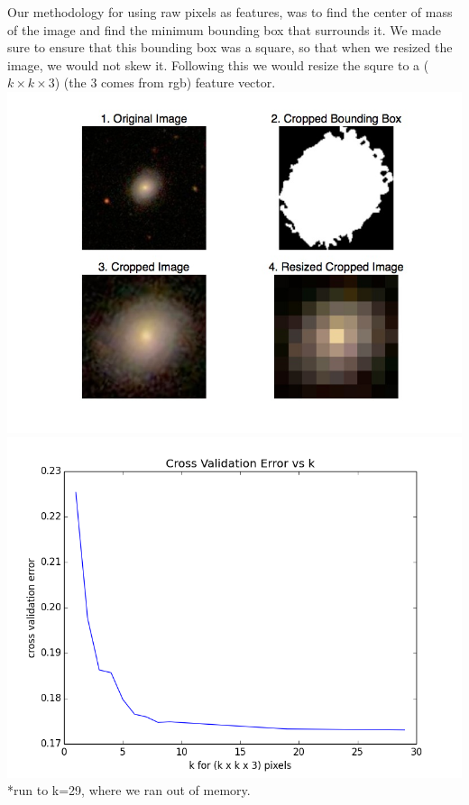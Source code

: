 \documentclass[landscape,a0paper,fontscale=0.292]{baposter}
\begin{document}
\begin{poster}
{   Our methodology for using raw pixels as features, was to find the center of mass of
   the image and find the minimum bounding box that surrounds it. We made sure to ensure that this
   bounding box was a square, so that when we resized the image, we would not skew it. Following
   this we would resize the squre to a ($k \times k \times 3$) (the 3 comes from rgb) feature
   vector. \includegraphics[width=0.95\linewidth]{hand_engineered_features.jpg}
   \includegraphics[width=0.95\linewidth,height=0.5\linewidth]{find_k_cv.jpg}
   *run to k=29, where we ran out of memory.
   
   }
\end{poster}%
%
\end{document}
